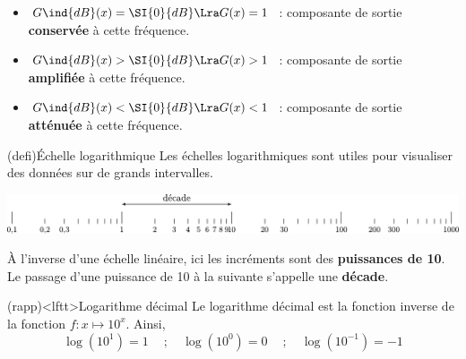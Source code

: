 \documentclass[../../main/main.tex]{subfiles}
\begin{document}
\begin{tcb*}[breakable]
\begin{enumerate}
		      \begin{itemize}
			      \item $G\ind{dB}(x) = \SI{0}{dB} \Lra G(x) = 1$~: composante
			            de sortie \textbf{conservée} à cette fréquence.
			      \item $G\ind{dB}(x) > \SI{0}{dB} \Lra G(x) > 1$~: composante
			            de sortie \textbf{amplifiée} à cette fréquence.
			      \item $G\ind{dB}(x) < \SI{0}{dB} \Lra G(x) < 1$~: composante
			            de sortie \textbf{atténuée} à cette fréquence.
		      \end{itemize}
	\end{enumerate}
\end{tcb*}

\vspace{-10pt}
\begin{tcb}(defi){Échelle logarithmique}
	Les échelles logarithmiques sont utiles pour visualiser des données
	sur de grands intervalles.
	\smallbreak
	\noindent
	\begin{minipage}{\linewidth}
		\centering
		\includegraphics[width=\linewidth]{logscale}
		\label{fig:logscale}
	\end{minipage}
	À l'inverse d'une échelle linéaire, ici les incréments sont des
	\textbf{puissances de 10}. Le passage d'une puissance de 10 à la suivante
	s'appelle une \textbf{décade}.
\end{tcb}

\begin{tcb}(rapp)<lftt>{Logarithme décimal}
	Le logarithme décimal est la fonction inverse de la fonction $f:x\mapsto
		10^{x}$. Ainsi,
	\[
		\log(10^{1}) = 1
		\quad~; \quad
		\log (10^{0}) = 0
		\quad~; \quad
		\log (10^{-1}) = -1
	\]
\end{tcb}
\end{document}
